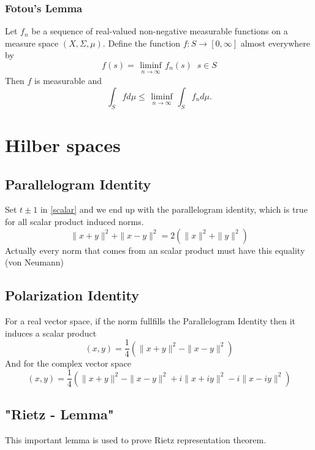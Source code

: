 \documentclass[titlepage]{article}
\begin{document}
 \subsubsection{Fotou's Lemma}
  Let $f_n$ be a sequence of real-valued non-negative measurable functions on a measure space $(X,\Sigma, \mu)$. Define the function $f: S \rightarrow [0,\infty]$ almost everywhere by
  \begin{equation}
  f(s) = \liminf \limits_{\substack{n\rightarrow \infty}} f_n(s)\;\; s\in S
  \end{equation}
Then $f$ is measurable and 
\begin{equation}
\int_S fd\mu \leq \liminf \limits_{\substack{n\rightarrow \infty}}
\int_S f_n d\mu.
\end{equation}  
  



\section{Hilber spaces}
\subsection{Parallelogram Identity}
Set $t\pm 1$ in \eqref{scalar} and we end up with the parallelogram identity, which is true for all scalar product induced norms.
\begin{equation}
\label{parallel}
\|x+y\|^2 + \|x-y\|^2 = 2\left(\|x\|^2+ \|y\|^2 \right)
\end{equation}
Actually every norm that comes from an scalar product must have this equality (von Neumann)
\subsection{Polarization Identity}
For a real vector space, if the norm fullfills the Parallelogram Identity then it induces a scalar product
\begin{equation}
(x,y) = \frac{1}{4}\left(\|x+y\|^2 - \|x-y\|^2\right)
\label{polreel}
\end{equation}
And for the complex vector space
\begin{equation}
(x,y) = \frac{1}{4}\left(\|x+y\|^2 - \|x-y\|^2 +i\|x+iy\|^2 - i\|x-iy\|^2   \right)
\label{polcomp}
\end{equation}


\subsection{"Rietz - Lemma"}
This important lemma is used to prove Rietz representation theorem.
\end{document}
